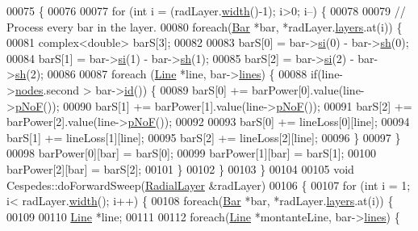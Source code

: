 \begin{DoxyCode}
00075 \{
00076 
00077   \textcolor{keywordflow}{for} (\textcolor{keywordtype}{int} i = (radLayer.\hyperlink{class_radial_layer_ae8b32d0711cc6f4dbec832bb07d59a49}{width}()-1); i>0; i--) \{
00078 
00079 \textcolor{comment}{// Process every bar in the layer.}
00080     \textcolor{keywordflow}{foreach}(\hyperlink{class_bar}{Bar} *bar, *radLayer.\hyperlink{class_radial_layer_a714c36b1ab50a7778953e924ddac2787}{layers}.at(i)) \{
00081       complex<double> barS[3];
00082 
00083       barS[0] = bar->\hyperlink{group___models_ga9af07eb85c2c76eb3bc73e25bb842c1e}{si}(0) - bar->\hyperlink{group___models_gac020fff2f22a9caab71f21205b5773f8}{sh}(0);
00084       barS[1] = bar->\hyperlink{group___models_ga9af07eb85c2c76eb3bc73e25bb842c1e}{si}(1) - bar->\hyperlink{group___models_gac020fff2f22a9caab71f21205b5773f8}{sh}(1);
00085       barS[2] = bar->\hyperlink{group___models_ga9af07eb85c2c76eb3bc73e25bb842c1e}{si}(2) - bar->\hyperlink{group___models_gac020fff2f22a9caab71f21205b5773f8}{sh}(2);
00086 
00087       \textcolor{keywordflow}{foreach} (\hyperlink{class_line}{Line} *line, bar->\hyperlink{class_bar_a5aabf1f4ac22e20e9cb702a3a7e08eea}{lines}) \{
00088         \textcolor{keywordflow}{if}(line->\hyperlink{class_line_afd17c40d656e6a8d677cb22df5f0c70b}{nodes}.second > bar->\hyperlink{group___models_gacf0fb781a73856bb7beb823304465e13}{id}()) \{
00089           barS[0] += barPower[0].value(line->\hyperlink{group___models_gabbc73ddedd3075c33ae5331bd7c9829f}{pNoF}());
00090           barS[1] += barPower[1].value(line->\hyperlink{group___models_gabbc73ddedd3075c33ae5331bd7c9829f}{pNoF}());
00091           barS[2] += barPower[2].value(line->\hyperlink{group___models_gabbc73ddedd3075c33ae5331bd7c9829f}{pNoF}());
00092 
00093           barS[0] += lineLoss[0][line];
00094           barS[1] += lineLoss[1][line];
00095           barS[2] += lineLoss[2][line];
00096         \}
00097       \}
00098       barPower[0][bar] = barS[0];
00099       barPower[1][bar] = barS[1];
00100       barPower[2][bar] = barS[2];
00101     \}
00102   \}
00103 \}
00104 
00105 \textcolor{keywordtype}{void} Cespedes::doForwardSweep(\hyperlink{class_radial_layer}{RadialLayer} &radLayer)
00106 \{
00107   \textcolor{keywordflow}{for} (\textcolor{keywordtype}{int} i = 1; i< radLayer.\hyperlink{class_radial_layer_ae8b32d0711cc6f4dbec832bb07d59a49}{width}(); i++) \{
00108     \textcolor{keywordflow}{foreach}(\hyperlink{class_bar}{Bar} *bar, *radLayer.\hyperlink{class_radial_layer_a714c36b1ab50a7778953e924ddac2787}{layers}.at(i)) \{
00109 
00110       \hyperlink{class_line}{Line} *line;
00111 
00112       \textcolor{keywordflow}{foreach}(\hyperlink{class_line}{Line} *montanteLine, bar->\hyperlink{class_bar_a5aabf1f4ac22e20e9cb702a3a7e08eea}{lines}) \{

\end{DoxyCode}
